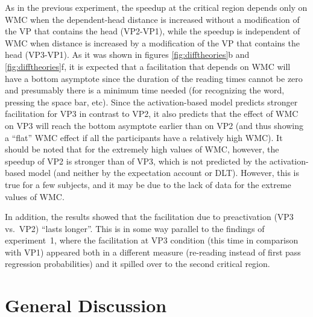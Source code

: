 \documentclass{frontiersSCNS}\usepackage{knitr}
\begin{document}
As in the previous experiment, the speedup at the critical region depends only on WMC when the dependent-head distance is increased without a modification of the VP that contains the head (VP2-VP1), while the speedup is independent of WMC when distance is increased by a modification of the VP that contains the head (VP3-VP1). As it was shown in figures \ref{fig:difftheories}b and \ref{fig:difftheories}f, it is expected that a facilitation that depends on WMC will have a bottom asymptote since the duration of the reading times cannot be zero and presumably there is a minimum time needed (for recognizing the word, pressing the space bar, etc). Since the activation-based model predicts stronger facilitation for VP3 in contrast to VP2, it also predicts that the effect of WMC on VP3 will reach the bottom asymptote earlier than on VP2 (and thus showing a ``flat'' WMC effect if all the participants have a relatively high WMC). It should be noted that for the extremely high values of WMC, however, the speedup of VP2 is stronger than of VP3, which is not predicted by the activation-based model (and neither by the expectation account or DLT). However, this is true for a few subjects, and it may be due to the lack of data for the extreme values of WMC.

In addition, the results showed that the facilitation due to preactivation (VP3 vs.\ VP2) ``lasts longer''. This is in some way parallel to the findings of experiment~1, where the facilitation at VP3 condition (this time in comparison with VP1) appeared both in a different measure (re-reading instead of first pass regression probabilities) and it spilled over to the second critical region.  



\section{General Discussion}

\end{document}

